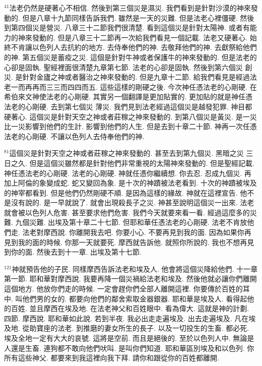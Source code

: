 \documentclass{book}
\begin{document}
$^{41}$法老仍然是硬著心不相信.
然後到第三個災是濕災.
我們看到是針對沙漠的神來發動的.
但是八章十九節同樣告訴我們.
雖然是一天的災難.
但是法老心裡僵硬.
然後到第四個災是營災.
八章三十二節我們很清楚.
看到這個災是針對太陽神.
或者有能力的神來發動的.
但是八章三十二節再一次給我們看見一個記載.
法老又硬著心.
始終不肯讓以色列人去抗約的地方.
去侍奉他們的神.
去敬拜他們的神.
去獻祭給他們的神.
第五個災是蓄疫之災.
這個是針對牛神或者保護牛的神來發動的.
但是法老的心卻是固執.
聖經裡面很清楚九章第七節.
法老的心卻是固執.
然後到第六個災 創災.
是針對金廬之神或者醫治之神來發動的.
但是九章十二節.
給我們看見是經過法老一而再再而三三而四四而五.
這些這樣的剛硬之後.
今次神任憑法老的心剛硬.
在希伯來文神使法老的心剛硬.
其實另一個翻譯是更加貼實的.
更加貼的就是神任憑法老的心剛硬.
去到第七個災 薄災.
我們見到法老經過這個災是越發犯罪.
神目都硬著心.
這個災是針對天空之神或者莊稼之神來發動的.
到第八個災是黃災.
是一災比一災影響到他們的生計.
影響到他們的人生.
但是去到十章二十節.
神再一次任憑法老的心剛硬.
不讓以色列人去侍奉他們的神.

$^{81}$這個災是針對天空之神或者莊稼之神來發動的.
甚至去到第九個災.
黑暗之災 三日之久.
但是這個災雖然都是針對他們非常重視的太陽神來發動的.
但是聖經記載.
神任憑法老的心剛硬.
法老的心剛硬.
神就任憑你繼續想.
你去忍.
忍成九個災.
再加上阿倫的象變成蛇.
蛇又變回為象.
是十次的神蹟被法老看到.
十次的神蹟被埃及的神宰都看到.
但是他們仍然剛硬不順.
是因為這樣的緣故.
神就在這裡宣告.
他不是沒有說的.
是一早就說了.
就會出現殺長子之災.
神甚至說明這個災一出來.
法老就會被以色列人危害.
甚至要求他們危害.
我們今天就要來看一看.
經過這麼多的災難.
九個災難.
出埃及第十章二十七節.
但耶和華任憑法老的心剛硬.
法老不肯放他們走.
法老對摩西說.
你離開我去吧.
你要小心.
不要再見到我的面.
因為如果你再見到我的面的時候.
你那一天就要死.
摩西就告訴他.
就照你所說的.
我也不想再見到你的面.
然後去到十一章.
出埃及第十七節.

$^{121}$神就預告他的子民.
同樣摩西告訴法老和埃及人.
他會將這個災降給他們.
十一章第一節.
耶和華對摩西說.
我要再降一個災禍給法老和埃及.
然後他就必讓你們離開這個地方.
他放你們走的時候.
一定會趕你們全部人離開這裡.
你要傳於百姓的耳中.
叫他們男的女的.
都要向他們的鄰舍索取金器銀器.
耶和華是埃及人.
看得起他的百姓.
並且摩西在埃及地.
在法老神父和百姓眼中.
看為偉大.
這就是神的計劃.
四節.
摩西說.
耶和華如此說.
若到半夜.
我必出走走遍埃及.
出去走遍埃及.
凡在埃及地.
從助寶座的法老.
到推磨的妻女所生的長子.
以及一切投生的生畜.
都必死.
埃及全地一定有大大的哀號.
這將是空前.
而且是絕後的.
至於以色列人中.
無論是人還是生畜.
連狗都不敢向他們吠叫.
是叫你們知道.
耶和華區別埃及和以色列.
你所有這些神父.
都要來到我這裡向我下拜.
請你和跟從你的百姓都離開.
\end{document}
